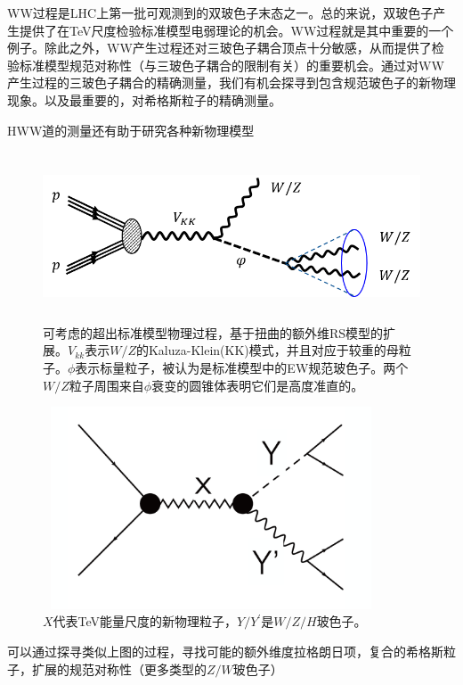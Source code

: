 WW过程是LHC上第一批可观测到的双玻色子末态之一。总的来说，双玻色子产生提供了在TeV尺度检验标准模型电弱理论的机会。WW过程就是其中重要的一个例子。除此之外，WW产生过程还对三玻色子耦合顶点十分敏感，从而提供了检验标准模型规范对称性（与三玻色子耦合的限制有关）的重要机会。通过对WW产生过程的三玻色子耦合的精确测量，我们有机会探寻到包含规范玻色子的新物理现象。以及最重要的，对希格斯粒子的精确测量。


HWW道的测量还有助于研究各种新物理模型

\begin{figure}[H]
 \centering
 \includegraphics[height=5cm, width=16cm]{pictures/Vkk.png}
  \caption{可考虑的超出标准模型物理过程，基于扭曲的额外维RS模型的扩展。$V_{kk}$表示$W/Z$的Kaluza-Klein(KK)模式，并且对应于较重的母粒子。$\phi$表示标量粒子，被认为是标准模型中的EW规范玻色子。两个$W/Z$粒子周围来自$\phi$衰变的圆锥体表明它们是高度准直的。}
 \label{fig:2.7}
\end{figure}

\begin{figure}[H]
 \centering
 \includegraphics[height=6cm, width=10cm]{pictures/diboson_resonance_X.png}
  \caption{$X$代表TeV能量尺度的新物理粒子，$Y/Y^\prime$是$W/Z/H$玻色子。}
 \label{fig:2.7}
\end{figure}
可以通过探寻类似上图的过程，寻找可能的额外维度拉格朗日项，复合的希格斯粒子，扩展的规范对称性（更多类型的$Z/W$玻色子）
